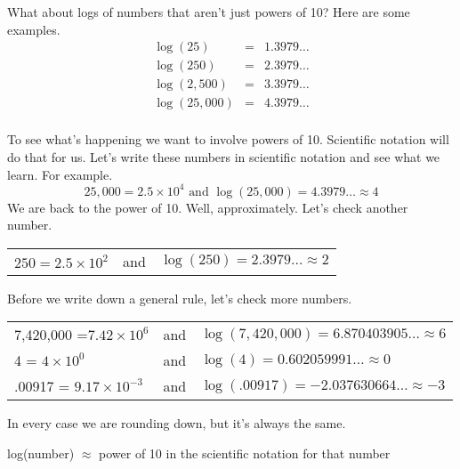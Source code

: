 What about logs of numbers that aren't just powers of 10? Here are some examples.
\begin{eqnarray*}
\log (25) & = & 1.3979\ldots \\
\log (250) & = & 2.3979\ldots \\
\log (2,500) & = & 3.3979\ldots \\
\log (25,000) & = & 4.3979\ldots \\
\end{eqnarray*}
\vspace{-.5in} %

To see what's happening we want to involve powers of 10.  Scientific notation will do that for us.  Let's write these numbers in scientific notation and see what we learn.  For example.
$$ 25,000 = 2.5 \times 10^4 \text{ and } \log( 25,000)=4.3979\ldots \approx 4$$
We are back to the power of 10.  Well, approximately.  Let's check another number.
\begin{center}
\begin{tabular} {lcl}
$250=2.5 \times 10^2$ & and & $\log(250)=2.3979\ldots \approx 2$ \\
\end{tabular}
\end{center}

Before we write down a general rule, let's check more numbers.
\begin{center}
\begin{tabular} {lcl}
7,420,000 =$7.42 \times 10^6$ & and & $\log(7,420,000)=6.870403905\ldots \approx 6$ \\
4 = $4 \times 10^0$ & and & $\log (4)=0.602059991\ldots \approx 0$ \\
.00917 =  $9.17 \times 10^{-3}$ & and & $\log (.00917)=-2.037630664\ldots \approx -3$\\
\end{tabular}
\end{center}
In every case we are rounding down, but it's always the same.

\begin{center}
log(number) $\approx$ power of 10 in the scientific notation for that number
\end{center}



%